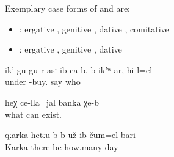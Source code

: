 Exemplary case forms of  and  are:
%
\begin{itemize}
	\item	{}: ergative , genitive , dative , comitative 
	\item	{}: ergative , genitive , dative 
\end{itemize}
%
\begin{exe}
	\ex	\label{ex:Someone bought it down (= the area around the village of Sanzhi), they say}
	\gll	ik'	gu	gu-r-asː-ib ca-b,	b-ik'ʷ-ar,	hi-l=el\\
			under	-buy. 	say	who\\
	\glt	{}

	\ex	\label{ex:There down is a can of something}
	\gll	heχ	ce-lla=jal	banka	χe-b\\
			what	can	exist.\\
	\glt	{}

	\ex	\label{ex:In Karka the bandits stayed for some days.}
	\gll	qːarka	hetːu-b	b-už-ib	čum=el	bari\\
		Karka	there	be	how.many	day\\
	\glt	{}
\end{exe}

